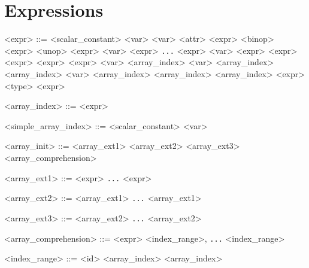 \section*{Expressions}

\begin{grammar}
<expr> ::=
           <scalar_constant>                          %
         \alt <var>                                      %
         \alt <var> \lit{\`} <attr>                   %
         \alt <expr> <binop> <expr>                      %
         \alt <unop> <expr>                              %
         \alt <var> \lit{(} <expr> \lit{,} \texttt{...} \lit{,} <expr> \lit{)}    %
         \alt {} <var> \lit{=} <expr>  <expr>         %
         \alt {} <expr>  <expr>  <expr>    %
         \alt <var> \lit{[} <array_index> \lit{]}                  %
         \alt <var> \lit{[} <array_index> \lit{]} \lit{[} <array_index> \lit{]}        %
         \alt <var> \lit{[} <array_index> \lit{]} \lit{[} <array_index> \lit{]} \lit{[} <array_index> \lit{]}       %
         \alt \lit{(} <expr> \lit{:} <type> \lit{)}                  %
         \alt \lit{(} <expr> \lit{)}

<array_index> ::= <expr>

<simple_array_index> ::= <scalar_constant> 
         \alt <var>

<array_init> ::= <array_ext1>
               \alt <array_ext2>
               \alt <array_ext3>
               \alt \lit{[} <array_comprehension> \lit{]}

<array_ext1> ::= \lit{[} <expr> \lit{,} \texttt{...} \lit{,} <expr> \lit{]}              

<array_ext2> ::= \lit{[} <array_ext1> \lit{,} \texttt{...} \lit{,} <array_ext1> \lit{]}              

<array_ext3> ::= \lit{[} <array_ext2> \lit{,} \texttt{...} \lit{,} <array_ext2> \lit{]}              

<array_comprehension> ::= \lit{[} <expr> \lit{|} <index_range>, \lit{,} \texttt{...} \lit{,} <index_range> \lit{]}

<index_range> ::= <id> \lit{=} <array_index>  <array_index>

\end{grammar}

